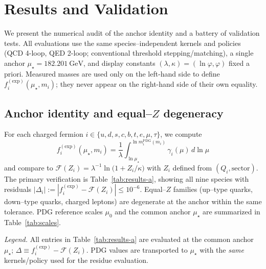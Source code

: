 \documentclass[aps,prd,onecolumn,amsmath,amssymb,superscriptaddress,nofootinbib,showpacs,showkeys]{revtex4-2}
\begin{document}
\section{Results and Validation}
\label{sec:results}

We present the numerical audit of the anchor identity and a battery of validation tests. All evaluations use the same species–independent kernels and policies (QCD 4-loop, QED 2-loop; conventional threshold stepping/matching), a single anchor $\mu_\star=182.201~\mathrm{GeV}$, and display constants $(\lambda,\kappa)=(\ln\varphi,\varphi)$ fixed a priori. Measured masses are used only on the left-hand side to define $f_i^{\mathrm{(exp)}}(\mu_\star,m_i)$; they never appear on the right-hand side of their own equality.

\subsection{Anchor identity and equal--\texorpdfstring{$Z$}{Z} degeneracy}
For each charged fermion $i\in\{u,d,s,c,b,t,e,\mu,\tau\}$, we compute
\[
f_i^{\mathrm{(exp)}}(\mu_\star,m_i)=\frac{1}{\lambda}\int_{\ln\mu_\star}^{\ln m_i^{\mathrm{PDG}}(m_i)}\gamma_i(\mu)\,d\ln\mu
\]
and compare to $\mathcal{F}(Z_i)=\lambda^{-1}\ln\!\bigl(1+Z_i/\kappa\bigr)$ with $Z_i$ defined from $(Q_i,\mathrm{sector})$. The primary verification is Table~\ref{tab:results-a}, showing all nine species with residuals $|\Delta_i|:=|f_i^{\mathrm{(exp)}}-\mathcal{F}(Z_i)|\le 10^{-6}$. Equal–$Z$ families (up–type quarks, down–type quarks, charged leptons) are degenerate at the anchor within the same tolerance. PDG reference scales $\mu_0$ and the common anchor $\mu_\star$ are summarized in Table~\ref{tab:scales}.

\noindent\emph{Legend.} All entries in Table~\ref{tab:results-a} are evaluated at the common anchor $\mu_\star$; $\Delta\equiv f_i^{\mathrm{(exp)}}-\mathcal F(Z_i)$. PDG values are transported to $\mu_\star$ with the \emph{same} kernels/policy used for the residue evaluation.
\end{document}
